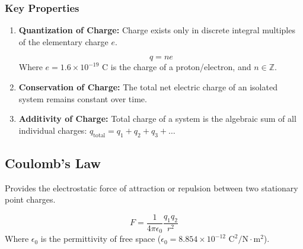\documentclass[11pt,a4paper]{article}
\begin{document}
\subsubsection{Key Properties}
\begin{enumerate}
    \item \textbf{Quantization of Charge:} Charge exists only in discrete integral multiples of the elementary charge $e$.
    \begin{formulabox}
        \[ q = ne \]
        Where $e = 1.6 \times 10^{-19}\text{ C}$ is the charge of a proton/electron, and $n \in \mathbb{Z}$.
    \end{formulabox}
    \item \textbf{Conservation of Charge:} The total net electric charge of an isolated system remains constant over time.
    \item \textbf{Additivity of Charge:} Total charge of a system is the algebraic sum of all individual charges: $q_{\text{total}} = q_1 + q_2 + q_3 + \dots$
\end{enumerate}

\subsection{Coulomb's Law}
Provides the electrostatic force of attraction or repulsion between two stationary point charges.

\begin{center}
\end{center}

\begin{formulabox}
    \[ F = \frac{1}{4\pi\epsilon_0} \frac{q_1 q_2}{r^2} \]
    Where $\epsilon_0$ is the permittivity of free space ($\epsilon_0 = 8.854 \times 10^{-12}\text{ C}^2/\text{N}\cdot\text{m}^2$).
\end{formulabox}
\end{document}
